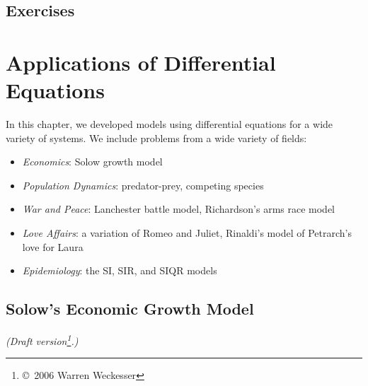 \documentclass[reqno]{immbook}
\numberwithin{equation}{chapter}
\numberwithin{question}{section}
\numberwithin{theorem}{chapter}
\numberwithin{figure}{chapter}
\theoremstyle{definition}
\begin{document}
\section{Exercises}
%
%
%

\chapter{Applications of Differential Equations}
%
In this chapter, we developed models using differential
equations for a wide variety of systems.
We include problems from a wide variety of fields:
\begin{itemize}
\item \emph{Economics}: Solow growth model
\item \emph{Population Dynamics}: predator-prey, competing species
\item \emph{War and Peace}: Lanchester battle model, Richardson's arms
race model
\item \emph{Love Affairs}: a variation of Romeo and Juliet, Rinaldi's
model of Petrarch's love for Laura
\item \emph{Epidemiology}: the SI, SIR, and SIQR models
\end{itemize}
%
\newpage
%
\section{Solow's Economic Growth Model}
\emph{(Draft version\footnote{\copyright ~2006 Warren Weckesser}.)}
\end{document}
